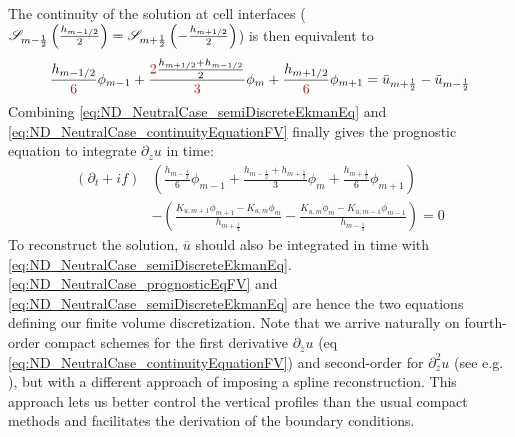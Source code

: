 The continuity of the solution at cell interfaces (${\cal S}_{m-\frac{1}{2}}\left(\frac{h_{m-1/2}}{2}\right) = {\cal S}_{m+\frac{1}{2}}\left(-\frac{h_{m+1/2}}{2}\right)$) is then equivalent to
%
\begin{equation}
\label{eq:ND_NeutralCase_continuityEquationFV}
	\frac{h_{m-1/2}}{\emphase{6}} \phi_{m-1} 
	+ \frac{\emphase{2}\frac{h_{m+1/2}+h_{m-1/2}}{2}}
		{\emphase{3}} \phi_m  
	+ \frac{h_{m+1/2}}{\emphase{6}} \phi_{m+1} = \Bar{u}_{m+\frac{1}{2}} - \Bar{u}_{m-\frac{1}{2}}
\end{equation}
Combining \eqref{eq:ND_NeutralCase_semiDiscreteEkmanEq}
and \eqref{eq:ND_NeutralCase_continuityEquationFV} finally gives
the prognostic equation to integrate
$\partial_z u$ in time:
\begin{equation}
\begin{aligned}
\label{eq:ND_NeutralCase_prognosticEqFV}
	(\partial_t + if) &\left( \frac{h_{m-\frac{1}{2}}}{6}
				\phi_{m-1}
	+ \frac{h_{m-\frac{1}{2}} + h_{m+\frac{1}{2}}}{3} \phi_m
	+ \frac{h_{m+\frac{1}{2}}}{6} \phi_{m+1} \right) \\
	&-
    \left(
	\frac{K_{u, m+1}\phi_{m+1} - K_{u, m}\phi_{m}}{ h_{m+\frac{1}{2}}} -
	\frac{K_{u, m}\phi_{m} - K_{u,m-1}\phi_{m-1}}{h_{m-\frac{1}{2}}}
    \right)
= 0
\end{aligned}
\end{equation}
To reconstruct the solution, $\overline{u}$ should also be 
integrated in time with \eqref{eq:ND_NeutralCase_semiDiscreteEkmanEq}.
\eqref{eq:ND_NeutralCase_prognosticEqFV} and
\eqref{eq:ND_NeutralCase_semiDiscreteEkmanEq} are hence the two 
equations defining our finite volume discretization.
Note that we arrive naturally on fourth-order compact schemes for
the first derivative $\partial_z u$
(eq \eqref{eq:ND_NeutralCase_continuityEquationFV})
and second-order for
$\partial_z^2 u$ (see e.g. \cite{piller_finite-volume_2004}),
but with a different approach of imposing a spline reconstruction.
This approach lets us better control the vertical profiles
than the usual compact methods and
facilitates the derivation of the boundary conditions.
